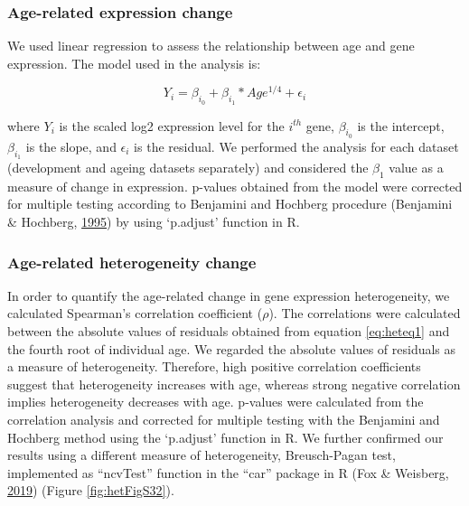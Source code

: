 \documentclass[12pt,twoside]{unicam}
\begin{document}
\hypertarget{age-related-expression-change}{%
\subsubsection{Age-related expression change}\label{age-related-expression-change}}

We used linear regression to assess the relationship between age and gene expression. The model used in the analysis is:

\begin{equation}
    Y_i = \beta_{i_0} + \beta_{i_1}*Age^{1/4} + \epsilon_i
  \label{eq:heteq1}
\end{equation}

where \(Y_i\) is the scaled log2 expression level for the \(i^{th}\) gene, \(\beta_{i_0}\) is the intercept, \(\beta_{i_1}\) is the slope, and \(\epsilon_i\) is the residual. We performed the analysis for each dataset (development and ageing datasets separately) and considered the \(\beta_1\) value as a measure of change in expression. p-values obtained from the model were corrected for multiple testing according to Benjamini and Hochberg procedure (Benjamini \& Hochberg, \protect\hyperlink{ref-Benjamini1995}{1995}) by using `p.adjust' function in R.

\hypertarget{age-related-heterogeneity-change}{%
\subsubsection{Age-related heterogeneity change}\label{age-related-heterogeneity-change}}

In order to quantify the age-related change in gene expression heterogeneity, we calculated Spearman's correlation coefficient (\(\rho\)). The correlations were calculated between the absolute values of residuals obtained from equation \eqref{eq:heteq1} and the fourth root of individual age. We regarded the absolute values of residuals as a measure of heterogeneity. Therefore, high positive correlation coefficients suggest that heterogeneity increases with age, whereas strong negative correlation implies heterogeneity decreases with age. p-values were calculated from the correlation analysis and corrected for multiple testing with the Benjamini and Hochberg method using the `p.adjust' function in R.
We further confirmed our results using a different measure of heterogeneity, Breusch-Pagan test, implemented as ``ncvTest'' function in the ``car'' package in R (Fox \& Weisberg, \protect\hyperlink{ref-Fox2019}{2019}) (Figure \ref{fig:hetFigS32}).
\end{document}
